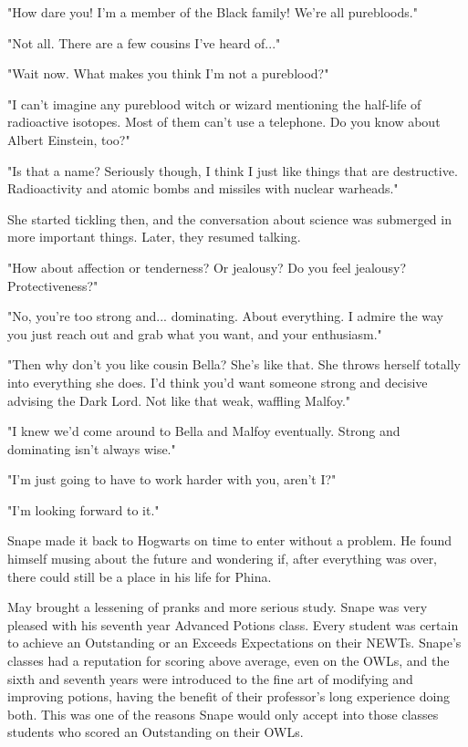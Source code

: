 "How dare you! I'm a member of the Black family! We're all purebloods."

"Not all. There are a few cousins I've heard of..."

"Wait now. What makes you think I'm not a pureblood?"

"I can't imagine any pureblood witch or wizard mentioning the half-life of radioactive isotopes. Most of them can't use a telephone. Do you know about Albert Einstein, too?"

"Is that a name? Seriously though, I think I just like things that are destructive. Radioactivity and atomic bombs and missiles with nuclear warheads."

She started tickling then, and the conversation about science was submerged in more important things. Later, they resumed talking.

"How about affection or tenderness? Or jealousy? Do you feel jealousy? Protectiveness?"

"No, you're too strong and... dominating. About everything. I admire the way you just reach out and grab what you want, and your enthusiasm."

"Then why don't you like cousin Bella? She's like that. She throws herself totally into everything she does. I'd think you'd want someone strong and decisive advising the Dark Lord. Not like that weak, waffling Malfoy."

"I knew we'd come around to Bella and Malfoy eventually. Strong and dominating isn't always wise."

"I'm just going to have to work harder with you, aren't I?"

"I'm looking forward to it."

Snape made it back to Hogwarts on time to enter without a problem. He found himself musing about the future and wondering if, after everything was over, there could still be a place in his life for Phina.

May brought a lessening of pranks and more serious study. Snape was very pleased with his seventh year Advanced Potions class. Every student was certain to achieve an Outstanding or an Exceeds Expectations on their NEWTs. Snape's classes had a reputation for scoring above average, even on the OWLs, and the sixth and seventh years were introduced to the fine art of modifying and improving potions, having the benefit of their professor's long experience doing both. This was one of the reasons Snape would only accept into those classes students who scored an Outstanding on their OWLs.

